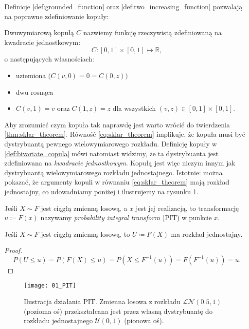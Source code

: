 Definicje \ref{def:grounded_function} oraz \ref{def:two_increasing_function} pozwalają na poprawne zdefiniowanie kopuły:
\begin{df}
	Dwuwymiarową kopułą $C$ nazwiemy funkcję rzeczywistą zdefiniowaną na kwadracie jednostkowym:
	$$ C\colon [0, 1]\times[0, 1] \mapsto \mathbb{R},$$ o następujących własnościach:
	\begin{itemize}
		\item uziemiona $\big(C(v, 0) = 0 = C(0, z)\big)$
		\item dwu-rosnąca
		\item $C(v, 1) = v$ oraz $C(1, z) = z$ dla wszystkich $(v, z)\in [0,1]\times [0, 1].$
	\end{itemize}
	\label{def:bivariate_copula}
\end{df}

Aby zrozumieć czym kopuła tak naprawdę jest warto wrócić do twierdzenia \ref{thm:sklar_theorem}. Równość \ref{eq:sklar_theorem} implikuje, że kopuła musi być dystrybuantą pewnego wielowymiarowego rozkładu. Definicję kopuły w \ref{def:bivariate_copula} mówi natomiast widzimy, że ta dystrybuanta jest zdefiniowana na \emph{kwadracie jednostkowym}. Kopułą jest więc niczym innym jak dystrybuantą wielowymiarowego rozkładu jednostajnego. Istotnie: można pokazać, że argumenty kopuli w równaniu \ref{eq:sklar_theorem} mają rozkład jednostajny, co udowadniamy poniżej i ilustrujemy na rysunku \ref{fig:PIT}.

\begin{df}
	Jeśli $X\sim F$ jest ciągłą zmienną losową, a $x$ jest jej realizacją, to transformację $u\coloneqq F(x)$ nazywamy \emph{probability integral transform} (PIT) w punkcie $x$.
\end{df}
\begin{thm}
	Jeśli $X\sim F$ jest ciągłą zmienną losową, to $U\coloneqq F(X)$ ma rozkład jednostajny.
\end{thm}
\begin{proof}
	$$P(U\leqslant u) = P(F(X) \leqslant u) = P(X\leqslant F^{-1}(u))=F(F^{-1}(u))=u.$$
\end{proof}

\begin{figure}[H]
	\centering
	\texttt{[image: 01\_PIT]}	
	\caption{Ilustracja działania PIT. Zmienna losowa z rozkładu $
		\mathcal{LN}(0.5, 1)$ (pozioma oś) przekształcana jest przez własną dystrybuantę do rozkładu jednostajnego $\mathcal{U}(0, 1)$ (pionowa oś).\label{fig:PIT}}
\end{figure}

